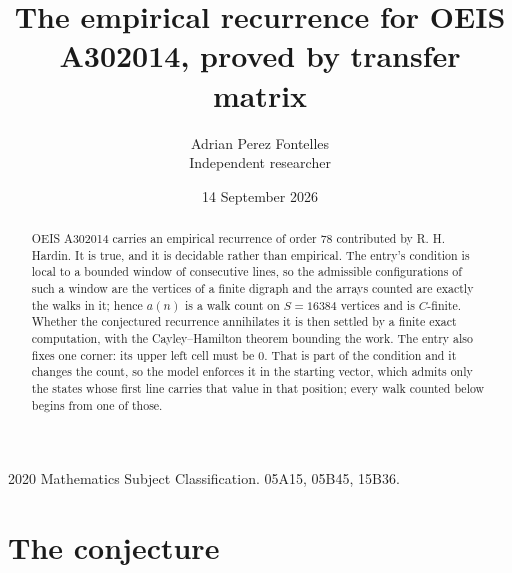 \documentclass[11pt,a4paper]{article}
\title{The empirical recurrence for OEIS A302014, proved by transfer matrix}
\author{Adrian Perez Fontelles\\ \small Independent researcher}
\date{14 September 2026}
\theoremstyle{plain}
\theoremstyle{definition}
\begin{document}
\maketitle

\begin{abstract}
OEIS A302014 carries an empirical recurrence of order $78$ contributed by R. H. Hardin. It is
true, and it is decidable rather than empirical. The entry's condition is local to a bounded window of consecutive lines, so
the admissible configurations of such a window are the vertices of a finite digraph and the
arrays counted are exactly the walks in it; hence $a(n)$ is a walk count on $S=16384$ vertices
and is $C$-finite. Whether the conjectured recurrence annihilates it is then settled by a
finite exact computation, with the Cayley--Hamilton theorem bounding the work.
 The entry also fixes one corner: its upper left cell must be $0$. That is part of the condition and it changes the count, so the model enforces it in the starting vector, which admits only the states whose first line carries that value in that position; every walk counted below begins from one of those.\end{abstract}

\noindent\small 2020 Mathematics Subject Classification. 05A15, 05B45, 15B36.\normalsize

\section{The conjecture}
\end{document}
